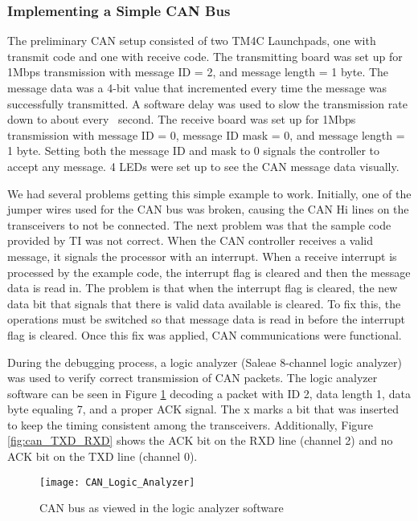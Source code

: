 \subsubsection{Implementing a Simple CAN Bus}
The preliminary CAN setup consisted of two TM4C Launchpads, one with transmit code and one with receive code. The transmitting board was set up for 1Mbps transmission with message ID = 2, and message length = 1 byte. The message data was a 4-bit value that incremented every time the message was successfully transmitted. A software delay was used to slow the transmission rate down to about every ~second. The receive board was set up for 1Mbps transmission with message ID = 0, message ID mask = 0, and message length = 1 byte. Setting both the message ID and mask to 0 signals the controller to accept any message. 4 LEDs were set up to see the CAN message data visually.

\noindent We had several problems getting this simple example to work. Initially, one of the jumper wires used for the CAN bus was broken, causing the CAN Hi lines on the transceivers to not be connected. The next problem was that the sample code provided by TI was not correct. When the CAN controller receives a valid message, it signals the processor with an interrupt. When a receive interrupt is processed by the example code, the interrupt flag is cleared and then the message data is read in. The problem is that when the interrupt flag is cleared, the new data bit that signals that there is valid data available is cleared. To fix this, the operations must be switched so that message data is read in before the interrupt flag is cleared. Once this fix was applied, CAN communications were functional. 

\noindent During the debugging process, a logic analyzer (Saleae 8-channel logic analyzer) was used to verify correct transmission of CAN packets. The logic analyzer software can be seen in Figure \ref{fig:can_logic_analyzer} decoding a packet with ID 2, data length 1, data byte equaling 7, and a proper ACK signal. The x marks a bit that was inserted to keep the timing consistent among the transceivers. Additionally, Figure \ref{fig:can_TXD_RXD} shows the ACK bit on the RXD line (channel 2) and no ACK bit on the TXD line (channel 0).

\begin{figure}[H]
	\centering
	\texttt{[image: CAN\_Logic\_Analyzer]}
	\caption{CAN bus as viewed in the logic analyzer software}
	\label{fig:can_logic_analyzer}
\end{figure}

